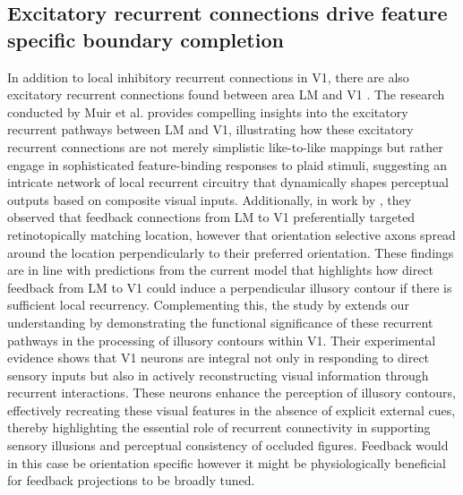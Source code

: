 \documentclass[12pt]{article}
\begin{document}
\subsection{Excitatory recurrent connections drive feature specific boundary completion}
  In addition to local inhibitory recurrent connections in V1, there are also excitatory recurrent connections found between area LM and V1 \autocite{muirSpecificExcitatoryConnectivity2017}. The research conducted by Muir et al. provides compelling insights into the excitatory recurrent pathways between LM and V1, illustrating how these excitatory recurrent connections are not merely simplistic like-to-like mappings but rather engage in sophisticated feature-binding responses to plaid stimuli, suggesting an intricate network of local recurrent circuitry that dynamically shapes perceptual outputs based on composite visual inputs. Additionally, in work by \textcite{marquesFunctionalOrganizationCortical2018}, they observed that feedback connections from LM to V1 preferentially targeted retinotopically matching location, however that orientation selective axons spread around the location perpendicularly to their preferred orientation. These findings are in line with predictions from the current model that highlights how direct feedback from LM to V1 could induce a perpendicular illusory contour if there is sufficient local recurrency. Complementing this, the study by \textcite{shinRecurrentPatternCompletion2023} extends our understanding by demonstrating the functional significance of these recurrent pathways in the processing of illusory contours within V1. Their experimental evidence shows that V1 neurons are integral not only in responding to direct sensory inputs but also in actively reconstructing visual information through recurrent interactions. These neurons enhance the perception of illusory contours, effectively recreating these visual features in the absence of explicit external cues, thereby highlighting the essential role of recurrent connectivity in supporting sensory illusions and perceptual consistency of occluded figures. Feedback would in this case be orientation specific however it might be physiologically beneficial for feedback projections to be broadly tuned.
\end{document}
